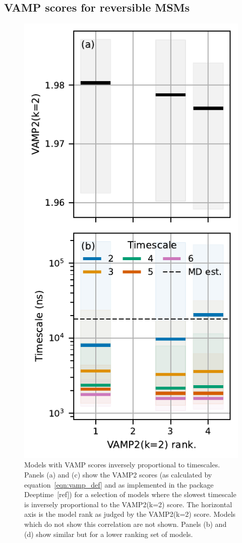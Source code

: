\documentclass[journal=jacsat,manuscript=article]{achemso}
\begin{document}
\subsection{VAMP scores for reversible MSMs}
\begin{figure}
    \centering
    \includegraphics{figures/bad_vamp_ranks.pdf}
    \caption{Models with VAMP scores inversely proportional to timescales. Panels (a) and (c) show the VAMP2 scores (as calculated by equation~\ref{eqn:vamp_def} and as implemented in the package Deeptime~[ref]) for a selection of models where the slowest timescale is inversely proportional to the VAMP2(k=2) score. The horizontal axis is the model rank as judged by the VAMP2(k=2) score. Models which do not show this correlation are not shown.  Panels (b) and (d) show similar but for a lower ranking set of models. }
    \label{fig:bad_vamp_scores}
\end{figure}
\end{document}
